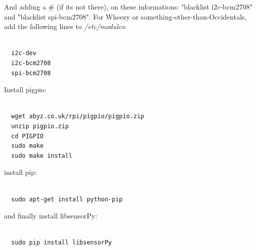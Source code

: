 \documentclass{acm_proc_article-sp}
\begin{document}
And adding a \# (if its not there), on these informations: "blacklist i2c-bcm2708" and "blacklist spi-bcm2708".
\newline
\newline
For Wheezy or something-other-than-Occidentals, add the following lines to \textit{/etc/modules}: 
\renewcommand{\theFancyVerbLine}{
  \sffamily\textcolor[rgb]{0.5,0.5,0.5}{\scriptsize\arabic{FancyVerbLine}}}
\begin{verbatim}

  i2c-dev
  i2c-bcm2708
  spi-bcm2708	

\end{verbatim}

Install pigpio:
\begin{verbatim}

  wget abyz.co.uk/rpi/pigpio/pigpio.zip
  unzip pigpio.zip
  cd PIGPIO
  sudo make
  sudo make install	
\end{verbatim}

install pip:
\begin{verbatim}

  sudo apt-get install python-pip
\end{verbatim}

and finally install libsensorPy:
\begin{verbatim}

  sudo pip install libsensorPy
\end{verbatim}
\end{document}
